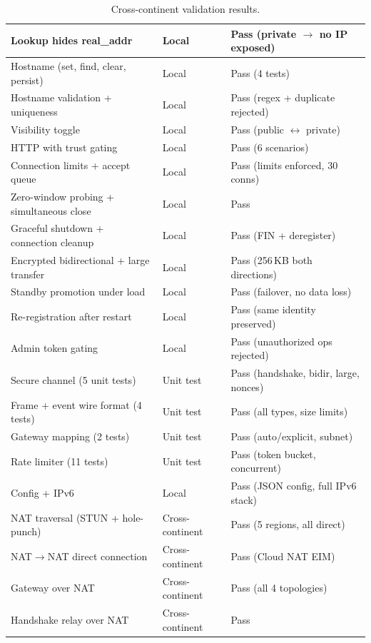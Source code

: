 \documentclass[11pt,a4paper]{article}
\begin{document}
\begin{table}[h]
\begin{tabular}{@{}lll@{}}
Lookup hides real\_addr & Local & Pass (private $\rightarrow$ no IP exposed) \\
\midrule
Hostname (set, find, clear, persist) & Local & Pass (4 tests) \\
Hostname validation + uniqueness & Local & Pass (regex + duplicate rejected) \\
Visibility toggle & Local & Pass (public $\leftrightarrow$ private) \\
HTTP with trust gating & Local & Pass (6 scenarios) \\
Connection limits + accept queue & Local & Pass (limits enforced, 30 conns) \\
Zero-window probing + simultaneous close & Local & Pass \\
Graceful shutdown + connection cleanup & Local & Pass (FIN + deregister) \\
\midrule
Encrypted bidirectional + large transfer & Local & Pass (256\,KB both directions) \\
Standby promotion under load & Local & Pass (failover, no data loss) \\
Re-registration after restart & Local & Pass (same identity preserved) \\
Admin token gating & Local & Pass (unauthorized ops rejected) \\
Secure channel (5 unit tests) & Unit test & Pass (handshake, bidir, large, nonces) \\
Frame + event wire format (4 tests) & Unit test & Pass (all types, size limits) \\
Gateway mapping (2 tests) & Unit test & Pass (auto/explicit, subnet) \\
Rate limiter (11 tests) & Unit test & Pass (token bucket, concurrent) \\
Config + IPv6 & Local & Pass (JSON config, full IPv6 stack) \\
\midrule
NAT traversal (STUN + hole-punch) & Cross-continent & Pass (5 regions, all direct) \\
NAT$\rightarrow$NAT direct connection & Cross-continent & Pass (Cloud NAT EIM) \\
Gateway over NAT & Cross-continent & Pass (all 4 topologies) \\
Handshake relay over NAT & Cross-continent & Pass \\
\bottomrule
\end{tabular}
\normalsize
\caption{Cross-continent validation results.}
\label{tab:results}
\end{table}
\end{document}
